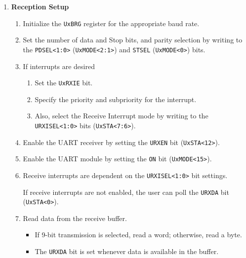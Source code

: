 \documentclass[a4paper]{article}
\begin{document}
\begin{enumerate}[label = \arabic*.]
    \item \textbf{Reception Setup}
      \begin{enumerate}[label = \arabic*.]
        \item Initialize the \verb|UxBRG| register for the appropriate baud rate.
        \item Set the number of data and Stop bits, and parity selection by writing to the \verb|PDSEL<1:0>| (\verb|UxMODE<2:1>|) and \verb|STSEL| (\verb|UxMODE<0>|) bits.
        \item If interrupts are desired
          \begin{enumerate}[label = \arabic*.]
            \item Set the \verb|UxRXIE| bit.
            \item Specify the priority and subpriority for the interrupt.
            \item Also, select the Receive Interrupt mode by writing to the \verb|URXISEL<1:0>| bits (\verb|UxSTA<7:6>|).
          \end{enumerate}
        \item Enable the UART receiver by setting the \verb|URXEN| bit (\verb|UxSTA<12>|).
        \item Enable the UART module by setting the \verb|ON| bit (\verb|UxMODE<15>|).
        \item Receive interrupts are dependent on the \verb|URXISEL<1:0>| bit settings.
          \par If receive interrupts are not enabled, the user can poll the \verb|URXDA| bit (\verb|UxSTA<0>|).
        \item Read data from the receive buffer.
          \begin{itemize}[leftmargin = 0.5cm]
            \item If 9-bit transmission is selected, read a word; otherwise, read a byte.
            \item The \verb|URXDA| bit is set whenever data is available in the buffer.
          \end{itemize}
      \end{enumerate}

  \end{enumerate}
\end{document}
